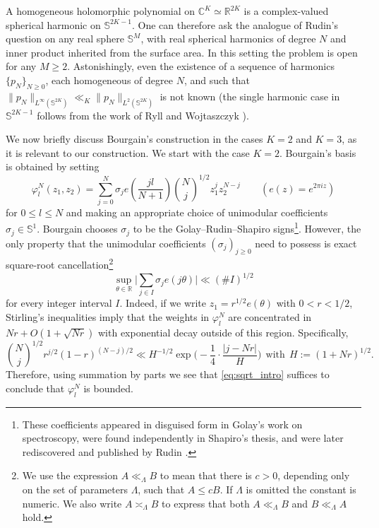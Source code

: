 \documentclass[a4paper,reqno,12pt]{amsart}
\theoremstyle{plain}
\theoremstyle{plain}
\theoremstyle{remark}
\theoremstyle{plain}
\newcommand{\RR}{\mathbb{R}}
\newcommand{\cp}{\mathbb{C}} %
\newcommand{\si}{\sigma}
\newcommand{\p}{\varphi}
\newcommand{\Sphere}{\mathbb{S}}
\theoremstyle{plain}
\theoremstyle{plain}
\begin{document}
{A homogeneous holomorphic polynomial on $\cp^K\simeq\RR^{2K}$ is a
complex-valued spherical harmonic on $\Sphere^{2K-1}$.  One can therefore ask the analogue of Rudin's question on any real sphere $\Sphere^{M}$, with real spherical harmonics of degree $N$ and inner product inherited from the surface area. In this setting the problem is open for any $M\geq 2$. Astonishingly, even the existence of a sequence of harmonics $\{p_N\}_{N\geq 0}$, each homogeneous of degree $N$, and such that $\|p_N\|_{L^\infty(\Sphere^{2K})} \ll_K \|p_N\|_{L^2(\Sphere^{2K})}$ is not known \cite[Corollary~1.4]{S} (the single harmonic case in $\Sphere^{2K-1}$ follows from the work of Ryll and Wojtaszczyk \cite{RW}).

%


We now {briefly discuss} Bourgain's construction in the cases $K = 2$ and $K = 3$, as it is relevant to our construction. We start with the case $K = 2$. Bourgain's basis is obtained by setting
\[
 \p_l^N(z_1,z_2)=
 \sum_{j=0}^N\sigma_j e\left(\frac{jl}{N+1}\right)\binom{N}j^{1/2} z_1^j z_2^{N-j} \qquad 
(e(z)=e^{2\pi i z})
\]
for $0\leq l\leq N$ and making an appropriate choice of unimodular coefficients $\si_j \in \Sphere^1$. Bourgain chooses $\si_j$ to be the Golay--Rudin--Shapiro signs\footnote{These coefficients appeared in disguised form in Golay's work on
spectroscopy, were found independently in Shapiro's thesis, and were
later rediscovered and published by Rudin
\cite{Golay,Shapiro,RudinRS}.}.  However, the only property that the unimodular coefficients $(\si_j)_{j\geq 0}$ need to possess is exact
square-root cancellation\footnote{{We use the expression} $A \ll_\Lambda B$ {to mean that there is $c>0$}, depending only on the set of parameters $\Lambda$, such that $A \leq c B$. If $\Lambda$ is omitted the constant is numeric. We also write $A \asymp_\Lambda B$ to express that both $A \ll_\Lambda B$ and $B \ll_\Lambda A$ hold.}
\begin{equation} \label{eq:sqrt_intro}
 \sup_{\theta\in\RR}
 \bigg|\sum_{j\in I}\sigma_j e(j\theta)\bigg|
 \ll(\#I)^{1/2}
\end{equation}
for every integer interval $I$. Indeed, if we write $z_1=r^{1/2}{e(\theta)}$ with $0<r<1/2$, Stirling’s inequalities imply that the weights in $\p_{l}^{N}$ are concentrated in $Nr + O(1 + \sqrt{N r})$ with exponential decay outside of this region. Specifically,
\[
\binom{N}j^{1/2}r^{j/2}(1-r)^{(N-j)/2} \ll  H^{-1/2} \exp \Big ( - \frac{1}{4} \cdot \frac{|j - N r|}{H} \Big )  \ \ \text{with} \ \ H := (1 + N r)^{1/2}.
\]
Therefore, using summation by parts we see that \eqref{eq:sqrt_intro} suffices to conclude that $\p_l^{N}$ is bounded. 
}
\end{document}
